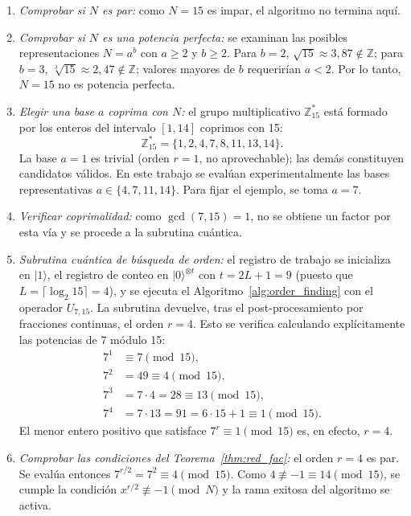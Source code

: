 \documentclass[12pt, spanish]{book}
\begin{document}
\begin{enumerate}
\item \textit{Comprobar si $N$ es par:} como $N = 15$ es impar, el algoritmo no termina aquí.

\item \textit{Comprobar si $N$ es una potencia perfecta:} se examinan las posibles representaciones $N = a^b$ con $a \geq 2$ y $b \geq 2$. Para $b = 2$, $\sqrt{15} \approx 3{,}87 \notin \mathbb{Z}$; para $b = 3$, $\sqrt[3]{15} \approx 2{,}47 \notin \mathbb{Z}$; valores mayores de $b$ requerirían $a < 2$. Por lo tanto, $N = 15$ no es potencia perfecta.

\item \textit{Elegir una base $a$ coprima con $N$:} el grupo multiplicativo $\mathbb{Z}_{15}^{*}$ está formado por los enteros del intervalo $[1, 14]$ coprimos con 15:
\[
    \mathbb{Z}_{15}^{*} = \{1, 2, 4, 7, 8, 11, 13, 14\}.
\]
La base $a = 1$ es trivial (orden $r = 1$, no aprovechable); las demás constituyen candidatos válidos. En este trabajo se evalúan experimentalmente las bases representativas $a \in \{4, 7, 11, 14\}$. Para fijar el ejemplo, se toma $a = 7$.

\item \textit{Verificar coprimalidad:} como $\gcd(7, 15) = 1$, no se obtiene un factor por esta vía y se procede a la subrutina cuántica.

\item \textit{Subrutina cuántica de búsqueda de orden:} el registro de trabajo se inicializa en $|1\rangle$, el registro de conteo en $|0\rangle^{\otimes t}$ con $t = 2L + 1 = 9$ (puesto que $L = \lceil \log_2 15 \rceil = 4$), y se ejecuta el Algoritmo~\ref{alg:order_finding} con el operador $U_{7,15}$. La subrutina devuelve, tras el post-procesamiento por fracciones continuas, el orden $r = 4$. Esto se verifica calculando explícitamente las potencias de 7 módulo 15:
\begin{align*}
    7^1 & \equiv 7  \pmod{15},                       \\
    7^2 & = 49 \equiv 4 \pmod{15},                   \\
    7^3 & = 7 \cdot 4 = 28 \equiv 13 \pmod{15},      \\
    7^4 & = 7 \cdot 13 = 91 = 6 \cdot 15 + 1 \equiv 1 \pmod{15}.
\end{align*}
El menor entero positivo que satisface $7^r \equiv 1 \pmod{15}$ es, en efecto, $r = 4$.

\item \textit{Comprobar las condiciones del Teorema~\ref{thm:red_fac}:} el orden $r = 4$ es par. Se evalúa entonces $7^{r/2} = 7^2 \equiv 4 \pmod{15}$. Como $4 \not\equiv -1 \equiv 14 \pmod{15}$, se cumple la condición $x^{r/2} \not\equiv -1 \pmod N$ y la rama exitosa del algoritmo se activa.


\end{enumerate}
\end{document}
